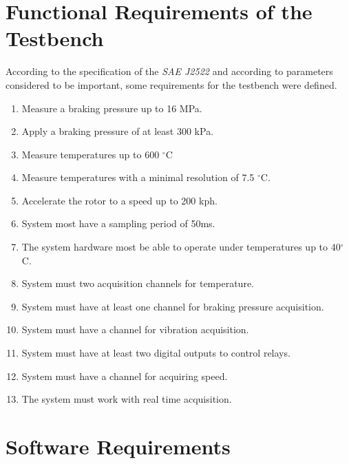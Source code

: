 \section{Functional Requirements of the Testbench}\label{sec:functionalRequirements}

	According to the specification of the \textit{SAE J2522} and according to parameters considered to be important, some requirements for the testbench were defined.

	\begin{enumerate}
		\item Measure a braking pressure up to 16 MPa.\label{itm:func-req-1}
		\item Apply a braking pressure of at least 300 kPa.\label{itm:func-req-2}
		\item Measure temperatures up to 600 $^{\circ}$C\label{itm:func-req-3}
		\item Measure temperatures with a minimal resolution of 7.5 $^{\circ}$C.\label{itm:func-req-4}
		\item Accelerate the rotor to a speed up to 200 kph.\label{itm:func-req-5}
		\item System most have a sampling period of 50ms.\label{itm:func-req-6}
		\item The system hardware most be able to operate under temperatures up to 40$^{\circ}$C.\label{itm:func-req-7}
		\item System must two acquisition channels for temperature.\label{itm:func-req-8}
		\item System must have at least one channel for braking pressure acquisition.\label{itm:func-req-9}
		\item System must have a channel for vibration acquisition.\label{itm:func-req-10}
		\item System must have at least two digital outputs to control relays.\label{itm:func-req-11}
		\item System must have a channel for acquiring speed.\label{itm:func-req-12}
		\item The system must work with real time acquisition.\label{itm:func-req-13}
	\end{enumerate}
	
\section{Software Requirements}\label{sec:software-requirements}
	
